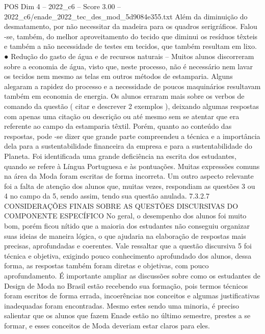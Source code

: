 \begin{textsample}{POS Dim 4 – 2022\_c6 – Score 3.00 – 2022\_c6/enade\_2022\_tec\_des\_mod\_5d9084e355.txt}
Além da diminuição do desmatamento, por não necessitar da madeira para os quadros serigráficos.
Falou -se, também, do melhor aproveitamento do tecido que diminui os resíduos têxteis e também a não necessidade de testes em tecidos, que também resultam em lixo. {\EmojiFont ●} Redução do gasto de água e de recursos naturais – Muitos alunos discorreram sobre a economia de água, visto que, neste processo, não é necessário nem lavar os tecidos nem mesmo as telas em outros métodos de estamparia.
Alguns alegaram a rapidez do processo e a necessidade de poucos maquinários resultavam também em economia de energia.
Os alunos erraram mais sobre os verbos de comando da questão ( citar e descrever 2 exemplos ), deixando algumas respostas com apenas uma citação ou descrição ou até mesmo sem se atentar que era referente ao campo da estamparia têxtil.
Porém, quanto ao conteúdo das respostas, pode -se dizer que grande parte compreendeu a técnica e a importância dela para a sustentabilidade financeira da empresa e para a sustentabilidade do Planeta.
Foi identificada uma grande deficiência na escrita dos estudantes, quando se refere à Língua Portuguesa e às pontuações.
Muitas expressões comuns na área da Moda foram escritas de forma incorreta.
Um outro aspecto relevante foi a falta de atenção dos alunos que, muitas vezes, respondiam as questões 3 ou 4 no campo da 5, sendo assim, tendo sua questão anulada. 7.3.2.7 CONSIDERAÇÕES FINAIS SOBRE AS QUESTÕES DISCURSIVAS DO COMPONENTE ESPECÍFICO No geral, o desempenho dos alunos foi muito bom, porém ficou nítido que a maioria dos estudantes não conseguiu organizar suas ideias de maneira lógica, o que ajudaria na elaboração de respostas mais precisas, aprofundadas e coerentes.
Vale ressaltar que a questão discursiva 5 foi técnica e objetiva, exigindo pouco conhecimento aprofundado dos alunos, dessa forma, as respostas também foram diretas e objetivas, com pouco aprofundamento.
É importante ampliar as discussões sobre como os estudantes de Design de Moda no Brasil estão recebendo sua formação, pois termos técnicos foram escritos de forma errada, incoerências nos conceitos e algumas justificativas inadequadas foram encontradas.
Mesmo estes sendo uma minoria, é preciso salientar que os alunos que fazem Enade estão no último semestre, prestes a se formar, e esses conceitos de Moda deveriam estar claros para eles.

\end{textsample}
